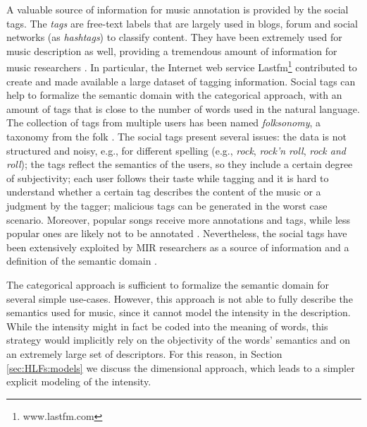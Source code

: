 A valuable source of information for music annotation is provided by the social tags. The \textit{tags} are free-text labels that are largely used in blogs, forum and social networks (as \textit{hashtags}) to classify content. They have been extremely used for music description as well, providing a tremendous amount of information for music researchers \cite{lamere2009}. In particular, the Internet web service Lastfm\footnote{www.lastfm.com} contributed to create and made available a large dataset of tagging information. Social tags can help to formalize the semantic domain with the categorical approach, with an amount of tags that is close to the number of words used in the natural language. The collection of tags from multiple users has been named \textit{folksonomy}, a taxonomy from the folk \cite{morrison2008tagging}. The social tags present several issues: the data is not structured and noisy, e.g., for different spelling (e.g., \textit{rock}, \textit{rock'n roll}, \textit{rock and roll}); the tags reflect the semantics of the users, so they include a certain degree of subjectivity;  each user follows their taste while tagging and it is hard to understand whether a certain tag describes the content of the music or a judgment by the tagger; malicious tags can be generated in the worst case scenario. Moreover, popular songs receive more annotations and tags, while less popular ones are likely not to be annotated \cite{lamere2009}. 
Nevertheless, the social tags have been extensively exploited by MIR researchers as a source of information and a definition of the semantic domain \cite{Celma2008,eck2008automatic,begelman2006automated,Levy2007}.

The  categorical approach is sufficient to formalize the semantic domain for several simple use-cases. However, this approach is not able to fully describe the semantics used for music, since it cannot model the intensity in the description. While the intensity might in fact be coded into the meaning of words, this strategy would implicitly rely on the objectivity of the words' semantics and on an extremely large set of descriptors. For this reason, in Section \ref{sec:HLFs:models} we discuss the dimensional approach, which leads to a simpler explicit modeling of the intensity.



